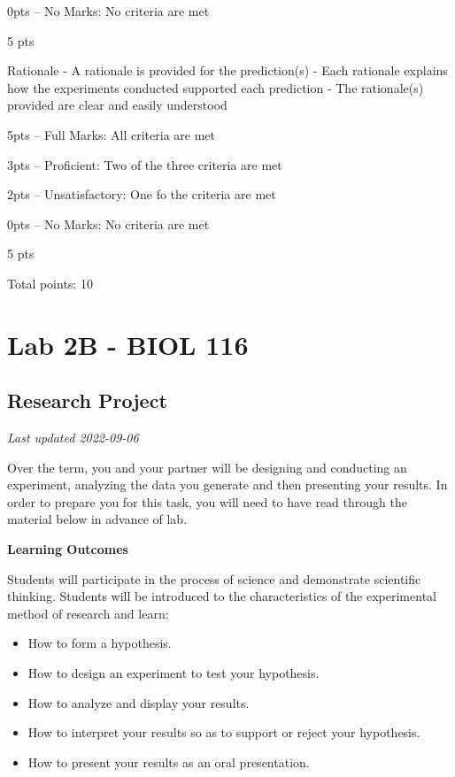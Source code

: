 \documentclass[
]{book}
\providecommand{\tightlist}{%
  \setlength{\itemsep}{0pt}\setlength{\parskip}{0pt}}
\begin{document}
0pts -- No Marks: No criteria are met

5 pts

Rationale
- A rationale is provided for the prediction(s)
- Each rationale explains how the experiments conducted supported each prediction
- The rationale(s) provided are clear and easily understood

5pts -- Full Marks: All criteria are met

3pts -- Proficient: Two of the three criteria are met

2pts -- Unsatisfactory: One fo the criteria are met

0pts -- No Marks: No criteria are met

5 pts

Total points: 10

\hypertarget{part-lab-2b---biol-116}{%
\part*{Lab 2B - BIOL 116}\label{part-lab-2b---biol-116}}

\hypertarget{research-project}{%
\chapter*{Research Project}\label{research-project}}

\emph{Last updated 2022-09-06}

Over the term, you and your partner will be designing and conducting an experiment, analyzing the data you generate and then presenting your results. In order to prepare you for this task, you will need to have read through the material below in advance of lab.

\textbf{Learning Outcomes}

Students will participate in the process of science and demonstrate scientific thinking. Students will be introduced to the characteristics of the experimental method of research and learn:

\begin{itemize}
\tightlist
\item
  How to form a hypothesis.
\item
  How to design an experiment to test your hypothesis.
\item
  How to analyze and display your results.
\item
  How to interpret your results so as to support or reject your hypothesis.
\item
  How to present your results as an oral presentation.
\end{itemize}
\end{document}
